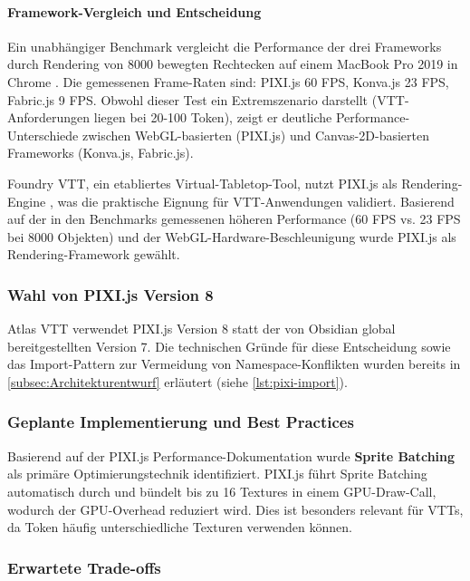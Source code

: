 \paragraph{Framework-Vergleich und Entscheidung}

Ein unabhängiger Benchmark vergleicht die Performance der drei Frameworks durch Rendering von 8000 bewegten Rechtecken auf einem MacBook Pro 2019 in Chrome \autocite{Canvas2025}. Die gemessenen Frame-Raten sind: PIXI.js 60 \ac{FPS}, Konva.js 23 \ac{FPS}, Fabric.js 9 \ac{FPS}. Obwohl dieser Test ein Extremszenario darstellt (\ac{VTT}-Anforderungen liegen bei 20-100 Token), zeigt er deutliche Performance-Unterschiede zwischen \ac{WebGL}-basierten (PIXI.js) und Canvas-2D-basierten Frameworks (Konva.js, Fabric.js).

Foundry \ac{VTT}, ein etabliertes Virtual-Tabletop-Tool, nutzt PIXI.js als Rendering-Engine \autocite{FoundryVTTWiki2024}, was die praktische Eignung für \ac{VTT}-Anwendungen validiert. Basierend auf der in den Benchmarks gemessenen höheren Performance (60 \ac{FPS} vs. 23 \ac{FPS} bei 8000 Objekten) und der \ac{WebGL}-Hardware-Beschleunigung wurde PIXI.js als Rendering-Framework gewählt.

\subsubsection{Wahl von PIXI.js Version 8}

Atlas \ac{VTT} verwendet PIXI.js Version 8 statt der von Obsidian global bereitgestellten Version 7. Die technischen Gründe für diese Entscheidung sowie das Import-Pattern zur Vermeidung von Namespace-Konflikten wurden bereits in \autoref{subsec:Architekturentwurf} erläutert (siehe \autoref{lst:pixi-import}).

\subsubsection{Geplante Implementierung und Best Practices}

Basierend auf der PIXI.js Performance-Dokumentation \autocite{PixiPerf2024} wurde \textbf{Sprite Batching} als primäre Optimierungstechnik identifiziert. PIXI.js führt Sprite Batching automatisch durch und bündelt bis zu 16 Textures in einem \ac{GPU}-Draw-Call, wodurch der \ac{GPU}-Overhead reduziert wird. Dies ist besonders relevant für \ac{VTT}s, da Token häufig unterschiedliche Texturen verwenden können.

\subsubsection{Erwartete Trade-offs}


